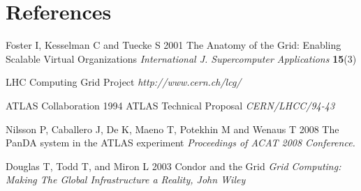 \documentclass[a4paper]{jpconf}
\begin{document}
\section*{References}
\begin{thebibliography}{99}

\item Foster I, Kesselman C and Tuecke S 2001 The Anatomy of the Grid: Enabling Scalable Virtual Organizations
      {\it International J. Supercomputer Applications} {\bf 15}(3)

\item LHC Computing Grid Project
      {\it http://www.cern.ch/lcg/}

\item ATLAS Collaboration 1994 ATLAS Technical Proposal 
      {\it CERN/LHCC/94-43} 

\item Nilsson P, Caballero J, De K, Maeno T, Potekhin M and Wenaus T 2008 The PanDA system in the ATLAS experiment
      {\it Proceedings of ACAT 2008 Conference.}

\item Douglas T, Todd T, and Miron L 2003 Condor and the Grid
      {\it Grid Computing: Making The Global Infrastructure a Reality, John Wiley}

\end{thebibliography}

~

\end{document}

